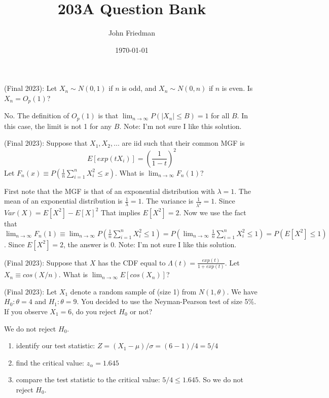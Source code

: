 \documentclass[answers]{exam}
\title{203A Question Bank}
\author{John Friedman}
\date{\today}
\begin{document}
\maketitle

\begin{questions}

\question (Final 2023): Let $X_n \sim N(0,1)$ if $n$ is odd, and $X_n \sim N(0,n)$ if $n$ is even. Is $X_n = O_p(1)$?
\begin{solution}
    No. The definition of $O_p(1)$ is that $\lim_{n \to \infty} P(|X_n| \leq B) = 1$ for all $B$. In this case, the limit is not 1 for any $B$.
    Note: I'm not sure I like this solution.
\end{solution}

\question (Final 2023): Suppose that $X_1,X_2,...$ are iid such that their common MGF is 
$$E[exp(t X_i)] = (\frac{1}{1-t})^2$$
Let $F_n(x) \equiv P(\frac{1}{n} \sum_{i=1}^n X_i^2 \leq x)$. What is $\lim_{n \to \infty} F_n(1)$?
\begin{solution}
    First note that the MGF is that of an exponential distribution with $\lambda = 1$. The mean of an exponential distribution is $\frac{1}{\lambda} = 1$. The variance is $\frac{1}{\lambda^2} = 1$. Since $Var(X) = E[X^2] - E[X]^2$ That implies $E[X^2] = 2$. Now we use the fact that 
    $\lim_{n \to \infty} F_n(1) \equiv \lim_{n \to \infty}  P(\frac{1}{n} \sum_{i=1}^n X_i^2 \leq 1) = P(\lim_{n \to \infty} \frac{1}{n} \sum_{i=1}^n X_i^2 \leq 1) = P(E[X^2] \leq 1)$. Since $E[X^2] = 2$, the answer is 0.
    Note: I'm not sure I like this solution.
    \end{solution}

\question (Final 2023): Suppose that $X$ has the CDF equal to $\Lambda(t) = \frac{exp(t)}{1+exp(t)}$. Let $X_n \equiv cos(X/n)$. What is $\lim_{n \to \infty} E[cos(X_n)]$?
\begin{solution}
\end{solution}

\question (Final 2023): Let $X_1$ denote a random sample of (size 1) from $N(1,\theta)$. We have $H_0 : \theta = 4$ and $H_1 : \theta = 9$. You decided to use the Neyman-Pearson test of size 5\%. If you observe $X_1=6$, do you reject $H_0$ or not?
\begin{solution}
    We do not reject $H_0$.
    \begin{enumerate}
        \item  identify our test statistic: $ Z = (X_1 - \mu)/\sigma = (6-1)/4 = 5/4$
        \item  find the critical value: $z_{\alpha} = 1.645$
        \item  compare the test statistic to the critical value: $5/4 \le 1.645$. So we do not reject $H_0$.
    \end{enumerate}


\end{solution}
\end{questions}
\end{document}
